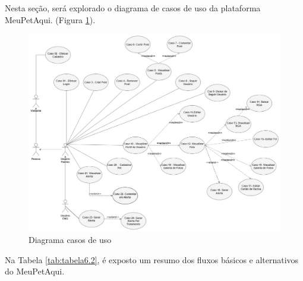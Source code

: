 Nesta seção, será explorado o diagrama de casos de uso da plataforma MeuPetAqui. (Figura \ref{fig:casosDeUso}).
\begin{figure}[htb]
     \centering
     \includegraphics[width=15cm]{arquivos/Figuras/diagrama.jpg}
     \caption{Diagrama casos de uso}
         \label{fig:casosDeUso}
\end{figure}

\newpage
Na Tabela \ref{tab:tabela6.2}, é exposto um resumo dos fluxos básicos e alternativos do MeuPetAqui.

